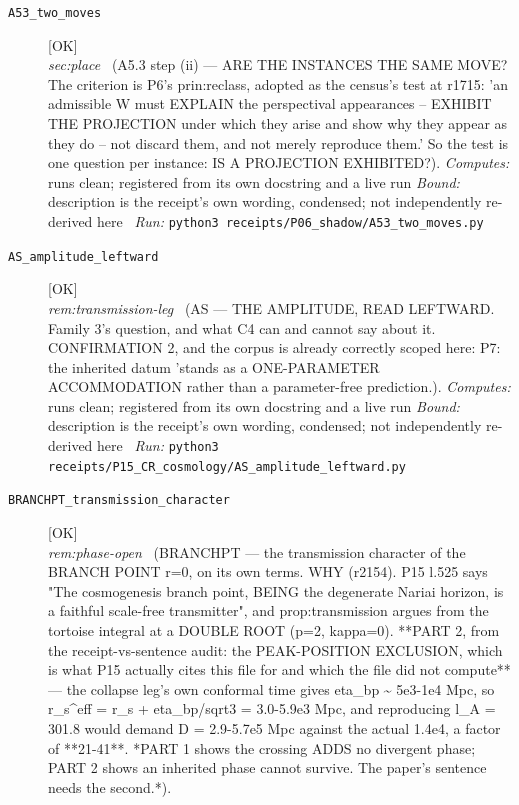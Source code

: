 \begin{description}
\item[\label{rcpt:A53_two_moves}\texttt{A53\_two\_moves}]\hfill\textsf{[OK]}\\
\textit{sec:place} \ (A5.3 step (ii) --- ARE THE INSTANCES THE SAME MOVE? The criterion is P6's prin:reclass, adopted as the census's test at r1715: 'an admissible W must EXPLAIN the perspectival appearances -- EXHIBIT THE PROJECTION under which they arise and show why they appear as they do -- not discard them, and not merely reproduce them.' So the test is one question per instance: IS A PROJECTION EXHIBITED?). 
\emph{Computes:} runs clean; registered from its own docstring and a live run
 \emph{Bound:} description is the receipt's own wording, condensed; not independently re-derived here
\ \emph{Run:} \texttt{python3 receipts/P06\_shadow/A53\_two\_moves.py}
\item[\label{rcpt:AS_amplitude_leftward}\texttt{AS\_amplitude\_leftward}]\hfill\textsf{[OK]}\\
\textit{rem:transmission-leg} \ (AS --- THE AMPLITUDE, READ LEFTWARD. Family 3's question, and what C4 can and cannot say about it. CONFIRMATION 2, and the corpus is already correctly scoped here: P7: the inherited datum 'stands as a ONE-PARAMETER ACCOMMODATION rather than a parameter-free prediction.). 
\emph{Computes:} runs clean; registered from its own docstring and a live run
 \emph{Bound:} description is the receipt's own wording, condensed; not independently re-derived here
\ \emph{Run:} \texttt{python3 receipts/P15\_CR\_cosmology/AS\_amplitude\_leftward.py}
\item[\label{rcpt:BRANCHPT_transmission_character}\texttt{BRANCHPT\_transmission\_character}]\hfill\textsf{[OK]}\\
\textit{rem:phase-open} \ (BRANCHPT --- the transmission character of the BRANCH POINT r=0, on its own terms. WHY (r2154). P15 l.525 says "The cosmogenesis branch point, BEING the degenerate Nariai horizon, is a faithful scale-free transmitter", and prop:transmission argues from the tortoise integral at a DOUBLE ROOT (p=2, kappa=0).  **PART 2, from the receipt-vs-sentence audit: the PEAK-POSITION EXCLUSION, which is what P15 actually cites this file for and which the file did not compute** --- the collapse leg's own conformal time gives eta\_bp \textasciitilde{} 5e3-1e4 Mpc, so r\_s\textasciicircum{}eff = r\_s + eta\_bp/sqrt3 = 3.0-5.9e3 Mpc, and reproducing l\_A = 301.8 would demand D = 2.9-5.7e5 Mpc against the actual 1.4e4, a factor of **21-41**. *PART 1 shows the crossing ADDS no divergent phase; PART 2 shows an inherited phase cannot survive. The paper's sentence needs the second.*). 

\end{description}
